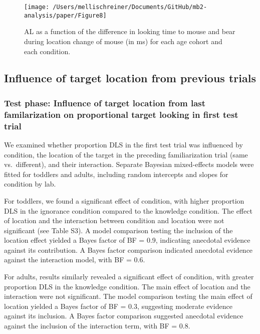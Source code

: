 \documentclass[
  man, donotrepeattitle,floatsintext]{apa6}
\begin{document}
\begin{figure}

{\centering \texttt{[image: /Users/mellischreiner/Documents/GitHub/mb2-analysis/paper/Figure8]} 

}

\caption{AL as a function of the difference in looking time to mouse and bear during location change of mouse (in ms) for each age cohort and each condition.}\label{fig:fig10}
\end{figure}

\subsection{Influence of target location from previous trials}\label{influence-of-target-location-from-previous-trials}

\subsubsection{Test phase: Influence of target location from last familarization on proportional target looking in first test trial}\label{test-phase-influence-of-target-location-from-last-familarization-on-proportional-target-looking-in-first-test-trial}

We examined whether proportion DLS in the first test trial was influenced by condition, the location of the target in the preceding familiarization trial (same vs.~different), and their interaction. Separate Bayesian mixed-effects models were fitted for toddlers and adults, including random intercepts and slopes for condition by lab.

For toddlers, we found a significant effect of condition, with higher proportion DLS in the ignorance condition compared to the knowledge condition. The effect of location and the interaction between condition and location were not significant (see Table S3). A model comparison testing the inclusion of the location effect yielded a Bayes factor of BF = 0.9, indicating anecdotal evidence against its contribution. A Bayes factor comparison indicated anecdotal evidence against the interaction model, with
BF = 0.6.

For adults, results similarly revealed a significant effect of condition, with greater proportion DLS in the knowledge condition. The main effect of location and the interaction were not significant. The model comparison testing the main effect of location yielded a Bayes factor of BF = 0.3, suggesting moderate evidence against its inclusion. A Bayes factor comparison suggested anecdotal evidence against the inclusion of the interaction term, with BF = 0.8.
\end{document}
